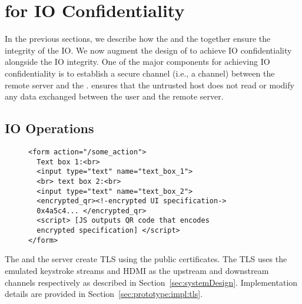 \section{\name for IO Confidentiality}
\label{sec:confidentiality}


In the previous sections, we describe how the \name \js and the \device together ensure the integrity of the IO. We now augment the design of \name to achieve IO confidentiality alongside the IO integrity. One of the major components for achieving IO confidentiality is to establish a secure channel (i.e., a \tls channel) between the remote server and the \device. \tls ensures that the untrusted host does not read or modify any data exchanged between the user and the remote server.


\subsection{IO Operations}
\label{sec:confidentiality:io}

\begin{figure}[t]
\small
\begin{lstlisting}[mathescape=true]
<form action="/some_action">
  Text box 1:<br>
  <input type="text" name="text_box_1">
  <br> text box 2:<br>
  <input type="text" name="text_box_2">
  <encrypted_qr><!-encrypted UI specification->
  0x4a5c4... </encrypted_qr>
  <script> [JS outputs QR code that encodes 
  encrypted specification] </script>
</form> 
\end{lstlisting} 
\end{figure}




 The \device and the server create TLS using the public certificates. The TLS uses the emulated keystroke streams and HDMI as the upstream and downstream channels respectively as described in Section~\ref{sec:systemDesign}. Implementation details are provided in Section~\ref{sec:prototype:impl:tls}. 

